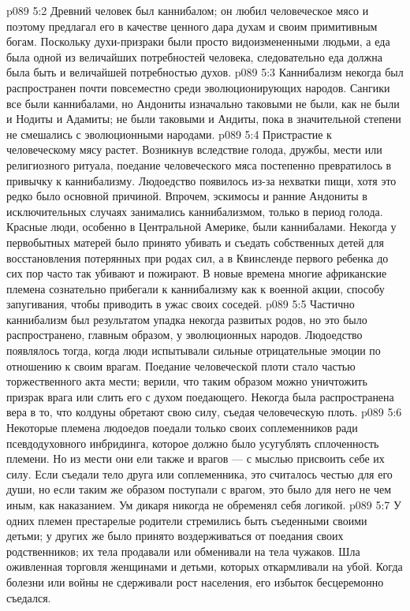 \vs p089 5:2 Древний человек был каннибалом; он любил человеческое мясо и поэтому предлагал его в качестве ценного дара духам и своим примитивным богам. Поскольку духи\hyp{}призраки были просто видоизмененными людьми, а еда была одной из величайших потребностей человека, следовательно еда должна была быть и величайшей потребностью духов.
\vs p089 5:3 Каннибализм некогда был распространен почти повсеместно среди эволюционирующих народов. Сангики все были каннибалами, но Андониты изначально таковыми не были, как не были и Нодиты и Адамиты; не были таковыми и Андиты, пока в значительной степени не смешались с эволюционными народами.
\vs p089 5:4 Пристрастие к человеческому мясу растет. Возникнув вследствие голода, дружбы, мести или религиозного ритуала, поедание человеческого мяса постепенно превратилось в привычку к каннибализму. Людоедство появилось из\hyp{}за нехватки пищи, хотя это редко было основной причиной. Впрочем, эскимосы и ранние Андониты в исключительных случаях занимались каннибализмом, только в период голода. Красные люди, особенно в Центральной Америке, были каннибалами. Некогда у первобытных матерей было принято убивать и съедать собственных детей для восстановления потерянных при родах сил, а в Квинсленде первого ребенка до сих пор часто так убивают и пожирают. В новые времена многие африканские племена сознательно прибегали к каннибализму как к военной акции, способу запугивания, чтобы приводить в ужас своих соседей.
\vs p089 5:5 Частично каннибализм был результатом упадка некогда развитых родов, но это было распространено, главным образом, у эволюционных народов. Людоедство появлялось тогда, когда люди испытывали сильные отрицательные эмоции по отношению к своим врагам. Поедание человеческой плоти стало частью торжественного акта мести; верили, что таким образом можно уничтожить призрак врага или слить его с духом поедающего. Некогда была распространена вера в то, что колдуны обретают свою силу, съедая человеческую плоть.
\vs p089 5:6 Некоторые племена людоедов поедали только своих соплеменников ради псевдодуховного инбридинга, которое должно было усугублять сплоченность племени. Но из мести они ели также и врагов --- с мыслью присвоить себе их силу. Если съедали тело друга или соплеменника, это считалось честью для его души, но если таким же образом поступали с врагом, это было для него не чем иным, как наказанием. Ум дикаря никогда не обременял себя логикой.
\vs p089 5:7 У одних племен престарелые родители стремились быть съеденными своими детьми; у других же было принято воздерживаться от поедания своих родственников; их тела продавали или обменивали на тела чужаков. Шла оживленная торговля женщинами и детьми, которых откармливали на убой. Когда болезни или войны не сдерживали рост населения, его избыток бесцеремонно съедался.
